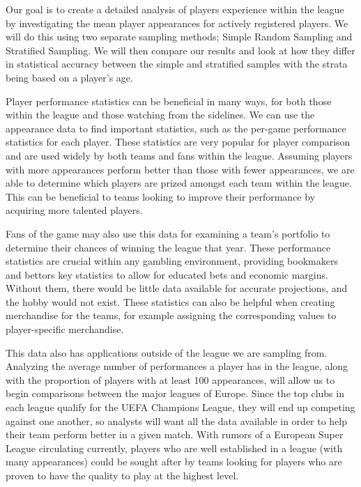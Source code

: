 \documentclass[paper=a4, fontsize=12pt,twoside]{article}	%
\begin{document}
Our goal is to create a detailed analysis of players experience within the league by investigating the mean player appearances for actively registered players. We will do this using two separate sampling methods; Simple Random Sampling and Stratified Sampling. We will then compare our results and look at how they differ in statistical accuracy between the simple and stratified samples with the strata being based on a player's age.

\vspace{2mm}
\noindent Player performance statistics can be beneficial in many ways, for both those within the league and those watching from the sidelines. We can use the appearance data to find important statistics, such as the per-game performance statistics for each player. These statistics are very popular for player comparison and are used widely by both teams and fans within the league. Assuming players with more appearances perform better than those with fewer appearances, we are able to determine which players are prized amongst each team within the league. This can be beneficial to teams looking to improve their performance by acquiring more talented players.

\vspace{2mm}
\noindent Fans of the game may also use this data for examining a team's portfolio to determine their chances of winning the league that year. These performance statistics are crucial within any gambling environment, providing bookmakers and bettors key statistics to allow for educated bets and economic margins. Without them, there would be little data available for accurate projections, and the hobby would not exist. These statistics can also be helpful when creating merchandise for the teams, for example assigning the corresponding values to player-specific merchandise.

\vspace{2mm}
\noindent This data also has applications outside of the league we are sampling from. Analyzing the average number of performances a player has in the league, along with the proportion of players with at least 100 appearances, will allow us to begin comparisons between the major leagues of Europe.  Since the top clubs in each league qualify for the UEFA Champions League, they will end up competing against one another, so analysts will want all the data available in order to help their team perform better in a given match.  With rumors of a European Super League circulating currently, players who are well established in a league (with many appearances) could be sought after by teams looking for players who are proven to have the quality to play at the highest level.  
\end{document}
